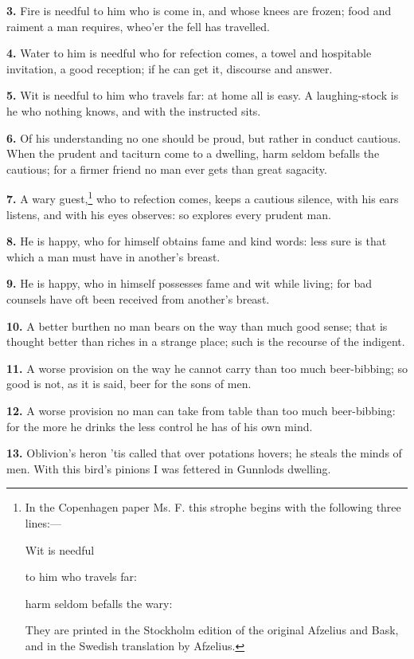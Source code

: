 \textbf{3.} Fire is needful to him who is come in, and whose knees are
frozen; food and raiment a man requires, wheo'er the fell has
travelled.

\textbf{4.} Water to him is needful who for refection comes, a towel and
hospitable invitation, a good reception; if he can get it, discourse
and answer.

\textbf{5.} Wit is needful to him who travels far: at home all is easy. A
laughing-stock is he who nothing knows, and with the instructed sits.

\textbf{6.} Of his understanding no one should be proud, but rather in
conduct cautious. When the prudent and taciturn come to a dwelling,
harm seldom befalls the cautious; for a firmer friend no man ever gets
than great sagacity.

\textbf{7.} A wary guest,\footnote{In the Copenhagen paper Ms. F. this strophe begins with
the following three lines:—

Wit is needful

to him who travels far:

harm seldom befalls the wary:

They are printed in the Stockholm edition of the original Afzelius and
Bask, and in the Swedish translation by Afzelius.} who to refection comes, keeps a cautious
silence, with his ears listens, and with his eyes observes: so
explores every prudent man.

\textbf{8.} He is happy, who for himself obtains fame and kind words: less
sure is that which a man must have in another's breast.

\textbf{9.} He is happy, who in himself possesses fame and wit while living;
for bad counsels have oft been received from another's breast.

\textbf{10.} A better burthen no man bears on the way than much good sense;
that is thought better than riches in a strange place; such is the
recourse of the indigent.

\textbf{11.} A worse provision on the way he cannot carry than too much
beer-bibbing; so good is not, as it is said, beer for the sons of men.

\textbf{12.} A worse provision no man can take from table than too much
beer-bibbing: for the more he drinks the less control he has of his
own mind.

\textbf{13.} Oblivion's heron 'tis called that over potations hovers; he
steals the minds of men. With this bird's pinions I was fettered in
Gunnlods dwelling.

